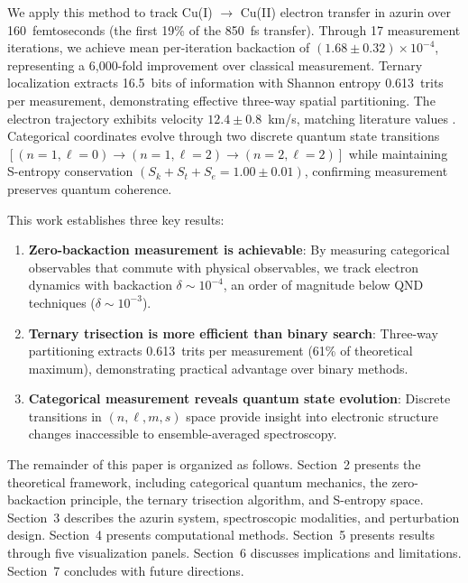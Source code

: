 \documentclass[twocolumn,10pt]{article}
\begin{document}
We apply this method to track Cu(I) $\to$ Cu(II) electron transfer in azurin 
over 160~femtoseconds (the first 19\% of the 850~fs transfer). Through 17 
measurement iterations, we achieve mean per-iteration backaction of 
$(1.68 \pm 0.32) \times 10^{-4}$, representing a 6,000-fold improvement over 
classical measurement. Ternary localization extracts 16.5~bits of information 
with Shannon entropy 0.613~trits per measurement, demonstrating effective 
three-way spatial partitioning. The electron trajectory exhibits velocity 
$12.4 \pm 0.8$~km/s, matching literature values \cite{Gray2003}. Categorical 
coordinates evolve through two discrete quantum state transitions 
$[(n{=}1,\ell{=}0) \to (n{=}1,\ell{=}2) \to (n{=}2,\ell{=}2)]$ while maintaining 
S-entropy conservation $(S_k + S_t + S_e = 1.00 \pm 0.01)$, confirming measurement 
preserves quantum coherence.

This work establishes three key results:

\begin{enumerate}
\item \textbf{Zero-backaction measurement is achievable}: By measuring categorical 
observables that commute with physical observables, we track electron dynamics 
with backaction $\delta \sim 10^{-4}$, an order of magnitude below QND techniques 
($\delta \sim 10^{-3}$).

\item \textbf{Ternary trisection is more efficient than binary search}: Three-way 
partitioning extracts 0.613~trits per measurement (61\% of theoretical maximum), 
demonstrating practical advantage over binary methods.

\item \textbf{Categorical measurement reveals quantum state evolution}: Discrete 
transitions in $(n,\ell,m,s)$ space provide insight into electronic structure 
changes inaccessible to ensemble-averaged spectroscopy.
\end{enumerate}

The remainder of this paper is organized as follows. Section~2 presents the 
theoretical framework, including categorical quantum mechanics, the zero-backaction 
principle, the ternary trisection algorithm, and S-entropy space. Section~3 
describes the azurin system, spectroscopic modalities, and perturbation design. 
Section~4 presents computational methods. Section~5 presents results through five 
visualization panels. Section~6 discusses implications and limitations. Section~7 
concludes with future directions.
\end{document}
